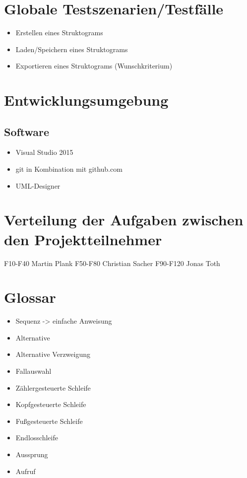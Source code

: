 \documentclass[a4paper,10pt]{report}
\begin{document}
\section{Globale Testszenarien/Testfälle}
\begin{itemize}
\item  Erstellen eines Struktograms
\item  Laden/Speichern eines Struktograms
\item  Exportieren eines Struktograms (Wunschkriterium)
\end{itemize}
\section{Entwicklungsumgebung}
\subsection{Software}
\begin{itemize}
\item Visual Studio 2015
\item git in Kombination mit github.com
\item UML-Designer
\end{itemize}
\section{Verteilung der Aufgaben zwischen den Projektteilnehmer}
F10-F40 Martin Plank
F50-F80 Christian Sacher
F90-F120 Jonas Toth


\section{Glossar}
\begin{itemize}
	\item Sequenz -> einfache Anweisung
	\item Alternative
	\item Alternative Verzweigung
	\item Fallauswahl
	\item Zählergesteuerte Schleife
	\item Kopfgesteuerte Schleife
	\item Fußgesteuerte Schleife
	\item Endlosschleife
	\item Aussprung
	\item Aufruf
\end{itemize}
\end{document}
